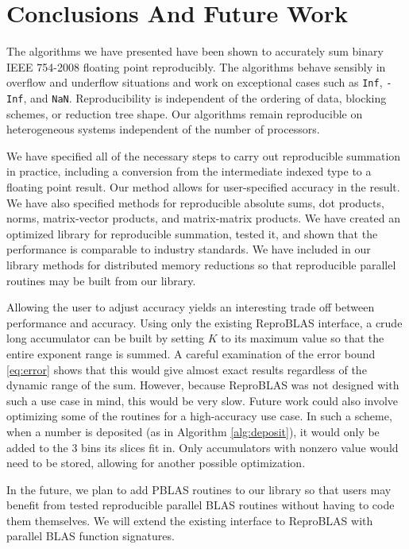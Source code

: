 \section{Conclusions And Future Work}
  The algorithms we have presented have been shown to accurately sum binary IEEE 754-2008 floating point reproducibly. The algorithms behave sensibly in overflow and underflow situations and work on exceptional cases such as \texttt{Inf}, \texttt{-Inf}, and \texttt{NaN}. Reproducibility is independent of the ordering of data, blocking schemes, or reduction tree shape. Our algorithms remain reproducible on heterogeneous systems independent of the number of processors.

   We have specified all of the necessary steps to carry out reproducible summation in practice, including a conversion from the intermediate indexed type to a floating point result. Our method allows for user-specified accuracy in the result. We have also specified methods for reproducible absolute sums, dot products, norms, matrix-vector products, and matrix-matrix products. We have created an optimized library for reproducible summation, tested it, and shown that the performance is comparable to industry standards. We have included in our library methods for distributed memory reductions so that reproducible parallel routines may be built from our library.

  Allowing the user to adjust accuracy yields an interesting trade off between performance and accuracy. Using only the existing ReproBLAS interface, a crude long accumulator can be built by setting $K$ to its maximum value so that the entire exponent range is summed. A careful examination of the error bound \eqref{eq:error} shows that this would give almost exact results regardless of the dynamic range of the sum. However, because ReproBLAS was not designed with such a use case in mind, this would be very slow. Future work could also involve optimizing some of the routines for a high-accuracy use case. In such a scheme, when a number is deposited (as in Algorithm \ref{alg:deposit}), it would only be added to the 3 bins its slices fit in. Only accumulators with nonzero value would need to be stored, allowing for another possible optimization.

   In the future, we plan to add PBLAS routines to our library so that users may benefit from tested reproducible parallel BLAS routines without having to code them themselves. We will extend the existing interface to ReproBLAS with parallel BLAS function signatures.
